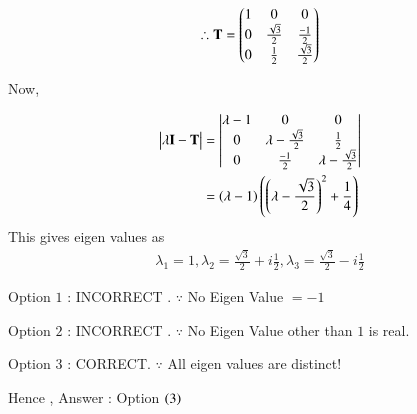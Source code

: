 \documentclass[journal]{IEEEtran}
\numberwithin{equation}{enumi}
\numberwithin{figure}{enumi}
\begin{document}
\begin{align}
    \therefore \mathbf{T} = \begin{pmatrix}1&0&0\\0&\frac{\sqrt{3}}{2}&\frac{-1}{2}\\ 0&\frac{1}{2}&\frac{\sqrt{3}}{2}\end{pmatrix}
\end{align}

Now, 

\begin{align}
    \begin{vmatrix}\lambda\mathbf{I}-\mathbf{T}\end{vmatrix} &= \begin{vmatrix}\lambda-1 & 0 & 0 \\ 0 & \lambda-\frac{\sqrt{3}}{2}& \frac{1}{2} \\ 0 & \frac{-1}{2} & \lambda-\frac{\sqrt{3}}{2}\end{vmatrix}\\
    &= \left(\lambda-1\right)\left(\left(\lambda-\frac{\sqrt{3}}{2}\right)^2 + \frac{1}{4}\right)
\end{align}
This gives eigen values as
\begin{align}
    \lambda_1 = 1 , \lambda_2 = \frac{\sqrt{3}}{2} + i\frac{1}{2} , \lambda_3 =\frac{\sqrt{3}}{2} - i\frac{1}{2}
\end{align}

Option $1$ : INCORRECT . $\because$ No Eigen Value $= -1$

Option $2$ : INCORRECT . $\because$ No Eigen Value other than $1$ is real. 

Option $3$ : CORRECT.    $\because$ All eigen values are distinct! 

Hence , Answer : Option $\left(3\right)$
\end{document}
